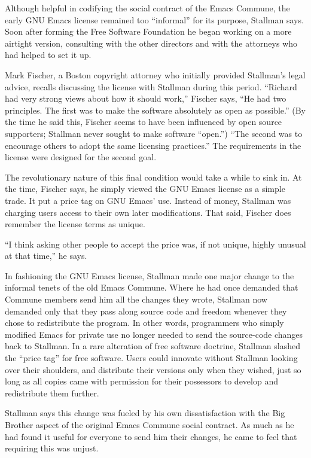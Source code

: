 Although helpful in codifying the social contract of the Emacs Commune, the early GNU Emacs license remained too ``informal'' for its purpose, Stallman says. Soon after forming the Free Software Foundation he began working on a more airtight version, consulting with the other directors and with the attorneys who had helped to set it up.

Mark Fischer, a Boston copyright attorney who initially provided Stallman's legal advice, recalls discussing the license with Stallman during this period. ``Richard had very strong views about how it should work,'' Fischer says, ``He had two principles. The first was to make the software absolutely as open as possible.'' (By the time he said this, Fischer seems to have been influenced by open source supporters; Stallman never sought to make software ``open.'') ``The second was to encourage others to adopt the same licensing practices.''  The requirements in the license were designed for the second goal.

The revolutionary nature of this final condition would take a while to sink in. At the time, Fischer says, he simply viewed the GNU Emacs license as a simple trade. It put a price tag on GNU Emacs' use. Instead of money, Stallman was charging users access to their own later modifications. That said, Fischer does remember the license terms as unique.

``I think asking other people to accept the price was, if not unique, highly unusual at that time,'' he says.

In fashioning the GNU Emacs license, Stallman made one major change to the informal tenets of the old Emacs Commune. Where he had once demanded that Commune members send him all the changes they wrote, Stallman now demanded only that they pass along source code and freedom whenever they chose to redistribute the program. In other words, programmers who simply modified Emacs for private use no longer needed to send the source-code changes back to Stallman. In a rare alteration of free software doctrine, Stallman slashed the ``price tag'' for free software. Users could innovate without Stallman looking over their shoulders, and distribute their versions only when they wished, just so long as all copies came with permission for their possessors to develop and redistribute them further.

Stallman says this change was fueled by his own dissatisfaction with the Big Brother aspect of the original Emacs Commune social contract. As much as he had found it useful for everyone to send him their changes, he came to feel that requiring this was unjust.

